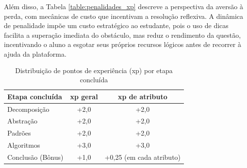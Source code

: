 Além disso, a Tabela \ref{table:penalidades_xp} descreve a perspectiva da aversão
à perda, com mecânicas de custo que incentivam a resolução reflexiva. A dinâmica
de penalidade impõe um custo estratégico ao estudante, pois o uso de dicas
facilita a superação imediata do obstáculo, mas reduz o rendimento da questão,
incentivando o aluno a esgotar seus próprios recursos lógicos antes de recorrer à
ajuda da plataforma.

\begin{table}[htbp]

    \centering
  \caption{\label{table:pontos_xp}Distribuição de pontos de experiência (\texorpdfstring{\acrshort{xp}}{XP}) por etapa concluída}

  \begin{tabular}{lcc} %

  \hline

  \textbf{Etapa concluída} & \textbf{\gls{xp} geral} & \textbf{\gls{xp} de atributo} \\ \hline

  Decomposição & +2,0 & +2,0 \\ \hline

  Abstração & +2,0 & +2,0 \\ \hline

  Padrões & +2,0 & +2,0 \\ \hline

  Algoritmos & +3,0 & +3,0 \\ \hline

  Conclusão (Bônus) & +1,0 & +0,25 (em cada atributo) \\ \hline

  \end{tabular}


\end{table}



